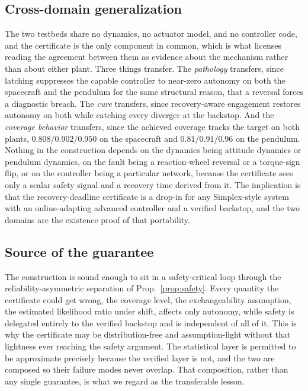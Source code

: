 \documentclass[journal]{IEEEtran}
\theoremstyle{plain}
\theoremstyle{definition}
\begin{document}
\subsection{Cross-domain generalization} The two testbeds share no dynamics, no
actuator model, and no controller code, and the certificate is the only component in common,
which is what licenses reading the agreement between them as evidence about the mechanism
rather than about either plant. Three things transfer. The \emph{pathology} transfers, since
latching suppresses the capable controller to near-zero autonomy on both the spacecraft and
the pendulum for the same structural reason, that a reversal forces a diagnostic breach. The
\emph{cure} transfers, since recovery-aware engagement restores autonomy on both while
catching every diverger at the backstop. And the \emph{coverage behavior} transfers, since
the achieved coverage tracks the target on both plants, $0.808/0.902/0.950$ on the spacecraft
and $0.81/0.91/0.96$ on the pendulum. Nothing in the construction depends on the dynamics
being attitude dynamics or pendulum dynamics, on the fault being a reaction-wheel reversal or
a torque-sign flip, or on the controller being a particular network, because the certificate
sees only a scalar safety signal and a recovery time derived from it. The implication is that
the recovery-deadline certificate is a drop-in for any Simplex-style system with an
online-adapting advanced controller and a verified backstop, and the two domains are the
existence proof of that portability.

\subsection{Source of the guarantee} The construction is sound enough to sit in a
safety-critical loop through the reliability-asymmetric separation of Prop.~\ref{prop:safety}.
Every quantity the certificate could get wrong, the coverage level, the exchangeability
assumption, the estimated likelihood ratio under shift, affects only autonomy, while safety is
delegated entirely to the verified backstop and is independent of all of it. This is why the
certificate may be distribution-free and assumption-light without that lightness ever reaching
the safety argument. The statistical layer is permitted to be approximate precisely because
the verified layer is not, and the two are composed so their failure modes never overlap. That
composition, rather than any single guarantee, is what we regard as the transferable lesson.
\end{document}
